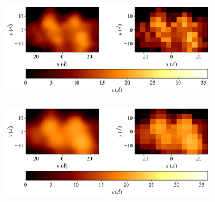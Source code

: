 \begin{figure}[H]
\centering
    \begin{subfigure}[t]{0.49\textwidth}
        \centering
        \caption{\label{fig: 1BNA AFM Image} }
        \includegraphics[width=1\linewidth]{Figures/AFMSimulationMolecule-1bna.png}
        
    \end{subfigure}
    \hfill
    \begin{subfigure}[t]{0.49\textwidth}
        \centering
        \caption{\label{fig: 1BNA AFM Image HS} }
        \includegraphics[width=1\linewidth]{Figures/AFMSimulationMolecule-1bna_HS.png}
    \end{subfigure}    

    \hfill
    

\end{figure}
